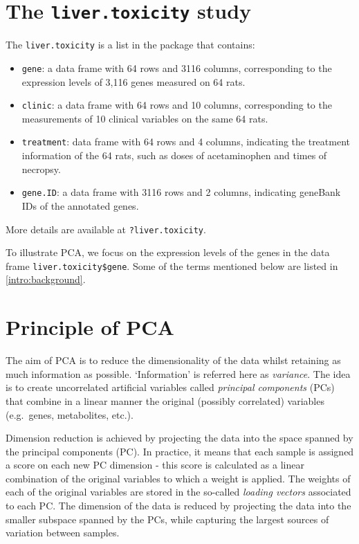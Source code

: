 \documentclass[]{book}
\theoremstyle{definition}
\theoremstyle{definition}
\theoremstyle{definition}
\theoremstyle{remark}
\begin{document}
\section{\texorpdfstring{The \texttt{liver.toxicity}
study}{The liver.toxicity study}}\label{the-liver.toxicity-study}

The \texttt{liver.toxicity} is a list in the package that contains:

\begin{itemize}
\item
  \texttt{gene}: a data frame with 64 rows and 3116 columns,
  corresponding to the expression levels of 3,116 genes measured on 64
  rats.
\item
  \texttt{clinic}: a data frame with 64 rows and 10 columns,
  corresponding to the measurements of 10 clinical variables on the same
  64 rats.
\item
  \texttt{treatment}: data frame with 64 rows and 4 columns, indicating
  the treatment information of the 64 rats, such as doses of
  acetaminophen and times of necropsy.
\item
  \texttt{gene.ID}: a data frame with 3116 rows and 2 columns,
  indicating geneBank IDs of the annotated genes.
\end{itemize}

More details are available at \texttt{?liver.toxicity}.

To illustrate PCA, we focus on the expression levels of the genes in the
data frame \texttt{liver.toxicity\$gene}. Some of the terms mentioned
below are listed in \ref{intro:background}.

\section{Principle of PCA}\label{principle-of-pca}

The aim of PCA \citep{Jol05} is to reduce the dimensionality of the data
whilst retaining as much information as possible. `Information' is
referred here as \emph{variance}. The idea is to create uncorrelated
artificial variables called \emph{principal components} (PCs) that
combine in a linear manner the original (possibly correlated) variables
(e.g.~genes, metabolites, etc.).

Dimension reduction is achieved by projecting the data into the space
spanned by the principal components (PC). In practice, it means that
each sample is assigned a score on each new PC dimension - this score is
calculated as a linear combination of the original variables to which a
weight is applied. The weights of each of the original variables are
stored in the so-called \emph{loading vectors} associated to each PC.
The dimension of the data is reduced by projecting the data into the
smaller subspace spanned by the PCs, while capturing the largest sources
of variation between samples.
\end{document}
